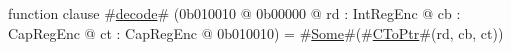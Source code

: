 function clause #\hyperref[zdecode]{decode}# (0b010010 @ 0b00000 @ rd : IntRegEnc @ cb : CapRegEnc @ ct : CapRegEnc @ 0b010010) = #\hyperref[zSome]{Some}#(#\hyperref[zCToPtr]{CToPtr}#(rd, cb, ct))
